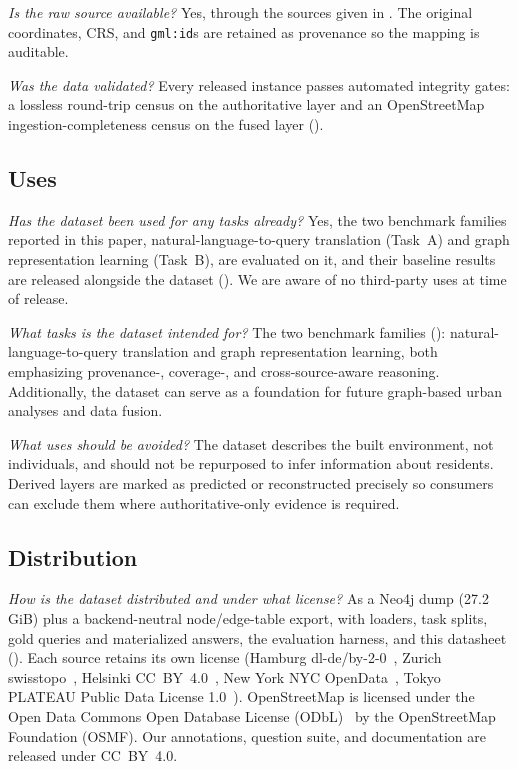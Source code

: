 \documentclass[sigconf,authordraft]{acmart}
\newcommand{\dsq}[1]{\par\smallskip\noindent\emph{#1}\space}
\begin{document}
\dsq{Is the raw source available?} Yes, through the sources given in . The original coordinates, CRS, and \texttt{gml:id}s are retained as provenance so the mapping is auditable.

\dsq{Was the data validated?} Every released instance passes automated integrity gates: a lossless round-trip census on the authoritative layer and an OpenStreetMap ingestion-completeness census on the fused layer ().

\subsection{Uses}

\dsq{Has the dataset been used for any tasks already?} Yes, the two benchmark families reported in this paper, natural-language-to-query translation (Task~A) and graph representation learning (Task~B), are evaluated on it, and their baseline results are released alongside the dataset (). We are aware of no third-party uses at time of release.

\dsq{What tasks is the dataset intended for?} The two benchmark families (): natural-language-to-query translation and graph representation learning, both emphasizing provenance-, coverage-, and cross-source-aware reasoning. Additionally, the dataset can serve as a foundation for future graph-based urban analyses and data fusion.

\dsq{What uses should be avoided?} The dataset describes the built environment, not individuals, and should not be repurposed to infer information about residents. Derived layers are marked as predicted or reconstructed precisely so consumers can exclude them where authoritative-only evidence is required.

\subsection{Distribution}

\dsq{How is the dataset distributed and under what license?} As a Neo4j dump (27.2 GiB) plus a backend-neutral node/edge-table export, with loaders, task splits, gold queries and materialized answers, the evaluation harness, and this datasheet (). Each source retains its own license (Hamburg dl-de/by-2-0~\cite{dlde_by20_2026}, Zurich swisstopo~\cite{swisstopo_ogdterms_2022}, Helsinki CC~BY~4.0~\cite{creativecommons_ccby40_2026}, New York NYC OpenData~\cite{nyc_opendata_2026}, Tokyo PLATEAU Public Data License 1.0~\cite{tokyo_license_2024}). OpenStreetMap is licensed under the Open Data Commons Open Database License (ODbL)~\cite{opendatacommons_odbl_2026} by the OpenStreetMap Foundation (OSMF). Our annotations, question suite, and documentation are released under CC~BY~4.0.
\end{document}

